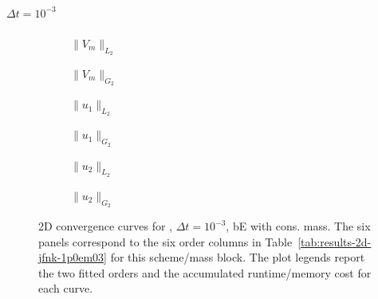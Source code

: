 \paragraph{$\Delta t=10^{-3}$}

\begin{figure}[p]
\centering
\begin{subfigure}{0.485\linewidth}
\centering
{}
\caption{$\|V_m\|_{L_2}$}
\label{fig:results-2d-jfnk-1p0em03-backwardeuler-consistent-a}
\end{subfigure}
\hfill
\begin{subfigure}{0.485\linewidth}
\centering
{}
\caption{$\|V_m\|_{G_2}$}
\label{fig:results-2d-jfnk-1p0em03-backwardeuler-consistent-b}
\end{subfigure}
\par\vspace{0.8em}
\begin{subfigure}{0.485\linewidth}
\centering
{}
\caption{$\|u_1\|_{L_2}$}
\label{fig:results-2d-jfnk-1p0em03-backwardeuler-consistent-c}
\end{subfigure}
\hfill
\begin{subfigure}{0.485\linewidth}
\centering
{}
\caption{$\|u_1\|_{G_2}$}
\label{fig:results-2d-jfnk-1p0em03-backwardeuler-consistent-d}
\end{subfigure}
\par\vspace{0.8em}
\begin{subfigure}{0.485\linewidth}
\centering
{}
\caption{$\|u_2\|_{L_2}$}
\label{fig:results-2d-jfnk-1p0em03-backwardeuler-consistent-e}
\end{subfigure}
\hfill
\begin{subfigure}{0.485\linewidth}
\centering
{}
\caption{$\|u_2\|_{G_2}$}
\label{fig:results-2d-jfnk-1p0em03-backwardeuler-consistent-f}
\end{subfigure}
\caption{2D convergence curves for , $\Delta t=10^{-3}$, bE with cons. mass. The six panels correspond to the six order columns in Table~\ref{tab:results-2d-jfnk-1p0em03} for this scheme/mass block. The plot legends report the two fitted orders and the accumulated runtime/memory cost for each curve.}
\label{fig:results-2d-jfnk-1p0em03-backwardeuler-consistent}
\end{figure}
\FloatBarrier

